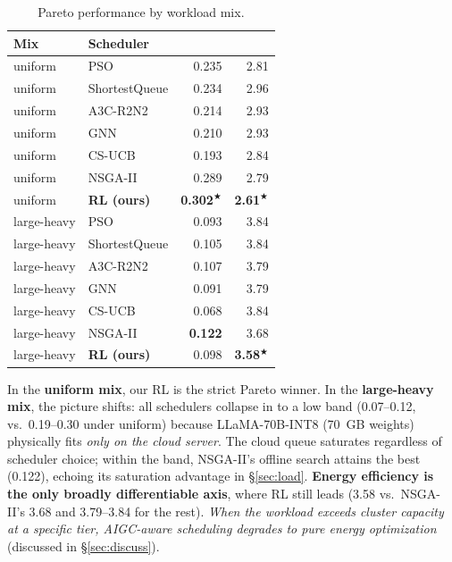 \begin{table}[t]
  \centering
  \caption{Pareto performance by workload mix.}
  \label{tab:workload}
  \small
  \begin{tabular}{llrr}
    \toprule
    Mix & Scheduler & \slo{} & \etok{} \\
    \midrule
    uniform & PSO            & 0.235 & 2.81 \\
    uniform & ShortestQueue  & 0.234 & 2.96 \\
    uniform & A3C-R2N2       & 0.214 & 2.93 \\
    uniform & GNN            & 0.210 & 2.93 \\
    uniform & CS-UCB         & 0.193 & 2.84 \\
    uniform & NSGA-II        & 0.289 & 2.79 \\
    uniform & \textbf{RL (ours)}
            & \textbf{0.302}$^\bigstar$ & \textbf{2.61}$^\bigstar$ \\
    \midrule
    large-heavy & PSO            & 0.093 & 3.84 \\
    large-heavy & ShortestQueue  & 0.105 & 3.84 \\
    large-heavy & A3C-R2N2       & 0.107 & 3.79 \\
    large-heavy & GNN            & 0.091 & 3.79 \\
    large-heavy & CS-UCB         & 0.068 & 3.84 \\
    large-heavy & NSGA-II        & \textbf{0.122} & 3.68 \\
    large-heavy & \textbf{RL (ours)}
                & 0.098 & \textbf{3.58}$^\bigstar$ \\
    \bottomrule
  \end{tabular}
\end{table}

In the \textbf{uniform mix}, our RL is the strict Pareto winner.
In the \textbf{large-heavy mix}, the picture shifts: all
schedulers collapse in \slo{} to a low band (0.07--0.12,
vs.\ 0.19--0.30 under uniform)
because LLaMA-70B-INT8 (70~GB weights) physically fits
\emph{only on the cloud server}. The cloud queue saturates
regardless of scheduler choice; within the band, NSGA-II's
offline search attains the best \slo{} (0.122), echoing its
saturation advantage in \S\ref{sec:load}. \textbf{Energy
efficiency is
the only broadly differentiable axis}, where RL still leads
(3.58 vs.\ NSGA-II's 3.68 and 3.79--3.84 for the rest).
\emph{When the
workload exceeds cluster capacity at a specific tier,
AIGC-aware scheduling degrades to pure energy optimization}
(discussed in \S\ref{sec:discuss}).

